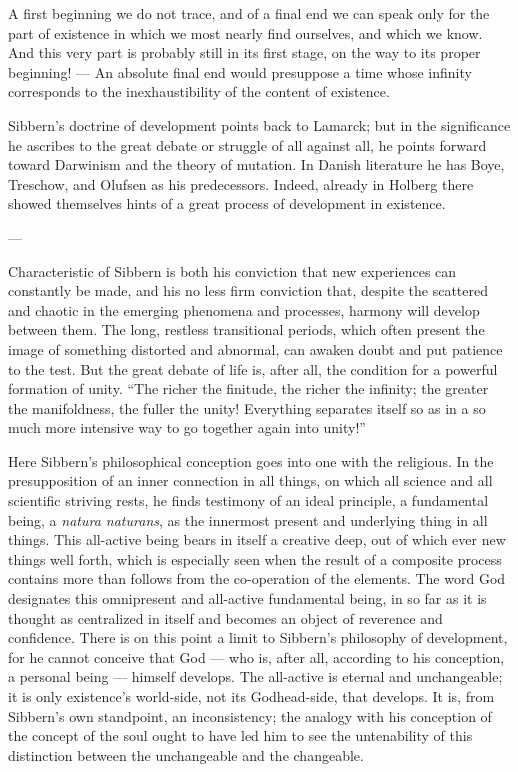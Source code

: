 \documentclass[12pt,a4paper]{book}
\newcommand{\opage}[1]{\marginnote{\footnotesize\textit{[#1]}}}
\begin{document}
A first beginning we do not trace, and of a final end we can speak only for the part of
existence in which we most nearly find ourselves, and which we know. And this very part is
probably still in its first stage, on the way to its proper beginning! --- An absolute final
end would presuppose a time whose infinity corresponds to the inexhaustibility of the
content of existence.

Sibbern's doctrine of development points back to Lamarck; but in the significance he ascribes
to the great debate or struggle of all against all, he points forward toward Darwinism and
\opage{105}the theory of mutation. In Danish literature he has Boye, Treschow, and Olufsen as his
predecessors. Indeed, already in Holberg there showed themselves hints of a great process of
development in existence.

\begin{center}---\end{center}

Characteristic of Sibbern is both his conviction that new experiences can constantly be made,
and his no less firm conviction that, despite the scattered and chaotic in the emerging
phenomena and processes, harmony will develop between them. The long, restless transitional
periods, which often present the image of something distorted and abnormal, can awaken doubt
and put patience to the test. But the great debate of life is, after all, the condition for a
powerful formation of unity. ``The richer the finitude, the richer the infinity; the greater
the manifoldness, the fuller the unity! Everything separates itself so as in a so much more
intensive way to go together again into unity!''

Here Sibbern's philosophical conception goes into one with the religious. In the
presupposition of an inner connection in all things, on which all science and all scientific
striving rests, he finds testimony of an ideal principle, a fundamental being, a \emph{natura
naturans}, as the innermost present and underlying thing in all things. This all-active being
bears in itself a creative deep, out of which ever new things well forth, which is especially
seen when the result of a composite process contains more than follows from the co-operation
of the elements. The word God designates this omnipresent and all-active fundamental being,
in so far as it is thought as centralized in itself and becomes an object of reverence and
confidence. There is on this point a limit to Sibbern's philosophy of development, for he
cannot conceive that God --- who is, after all, according to his conception, a personal being
--- himself develops. The all-active is eternal and unchangeable; it is only existence's
world-side, not its Godhead-side, that develops. It is, from Sibbern's own standpoint, an
inconsistency; \opage{106}the analogy with his conception of the concept of the soul ought to have led
him to see the untenability of this distinction between the unchangeable and the changeable.
\end{document}
